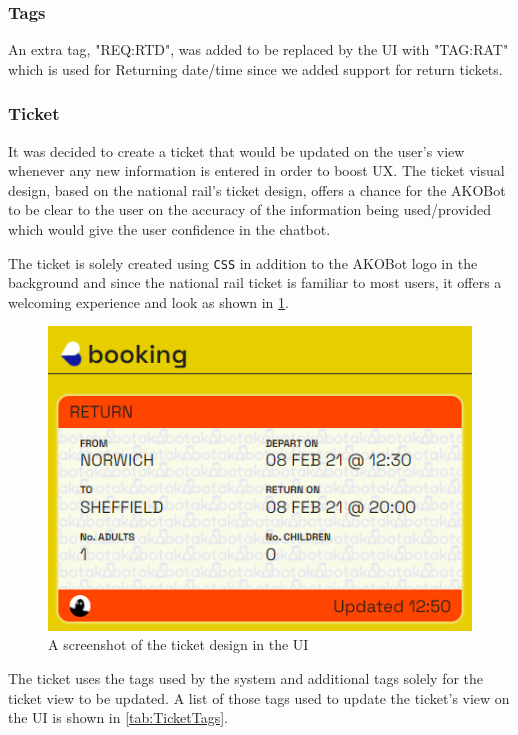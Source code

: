 \documentclass[11pt]{article}
\newcommand{\code}[1]{{\texttt{#1}}}
\begin{document}
        
        
        \subsubsection{Tags}
        An extra tag, "{REQ:RTD}", was added to be replaced by the UI with "{TAG:RAT}" which is used for Returning date/time since we added support for return tickets. 
        
        \subsubsection{Ticket}\label{sec:ticketDesignImp}
        It was decided to create a ticket that would be updated on the user's view whenever any new information is entered in order to boost UX. The ticket visual design, based on the national rail's ticket design, offers a chance for the AKOBot to be clear to the user on the accuracy of the information being used/provided which would give the user confidence in the chatbot.
        
        The ticket is solely created using \code{CSS} in addition to the AKOBot logo in the background and since the national rail ticket is familiar to most users, it offers a welcoming experience and look as shown in \cref{fig:TicketView}. 
        
        \begin{figure}[!ht]
            \centering
            \includegraphics{TicketView.png}
            \caption{A screenshot of the ticket design in the UI}
            \label{fig:TicketView}
        \end{figure}
        
        The ticket uses the tags used by the system and additional tags solely for the ticket view to be updated. A list of those tags used to update the ticket's view on the UI is shown in \cref{tab:TicketTags}.
        
\end{document}
